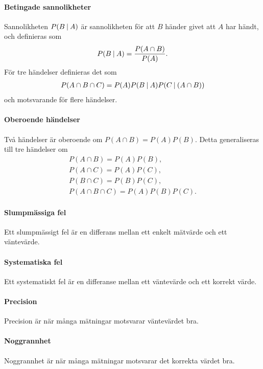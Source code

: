 \paragraph{Betingade sannolikheter}
Sannolikheten $P(B\:\vert\: A)$ är sannolikheten för att $B$ händer givet att $A$ har händt, och definieras som
\begin{align*}
	P(B\:\vert\: A) = \frac{P(A\cap B)}{P(A)}.
\end{align*}
För tre händelser definieras det som
\begin{align*}
	P(A\cap B\cap C) = P(A)P(B\:\vert\: A)P(C\:\vert\: (A\cap B))
\end{align*}
och motsvarande för flere händelser.

\paragraph{Oberoende händelser}
Två händelser är oberoende om $P(A\cap B) = P(A)P(B)$. Detta generaliseras till tre händelser om
\begin{align*}
	P(A\cap B) = P(A)P(B), \\
	P(A\cap C) = P(A)P(C), \\
	P(B\cap C) = P(B)P(C), \\
	P(A\cap B\cap C) = P(A)P(B)P(C).
\end{align*}

\paragraph{Slumpmässiga fel}
Ett slumpmässigt fel är en differans mellan ett enkelt mätvärde och ett väntevärde.

\paragraph{Systematiska fel}
Ett systematiskt fel är en differanse mellan ett väntevärde och ett korrekt värde.

\paragraph{Precision}
Precision är när många mätningar motsvarar väntevärdet bra.

\paragraph{Noggrannhet}
Noggrannhet är när många mätningar motsvarar det korrekta värdet bra.


